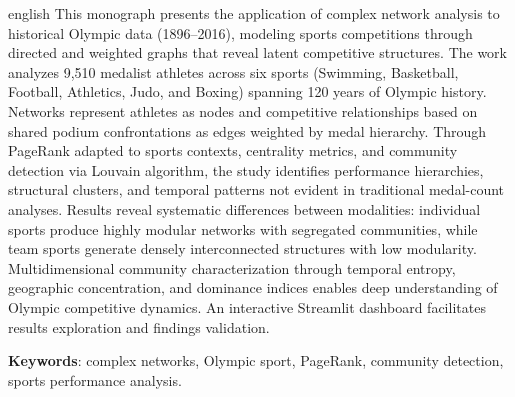 \begin{resumo}[Abstract]
 \begin{otherlanguage*}{english}
   This monograph presents the application of complex network analysis to historical Olympic data (1896--2016), modeling sports competitions through directed and weighted graphs that reveal latent competitive structures. The work analyzes 9,510 medalist athletes across six sports (Swimming, Basketball, Football, Athletics, Judo, and Boxing) spanning 120 years of Olympic history. Networks represent athletes as nodes and competitive relationships based on shared podium confrontations as edges weighted by medal hierarchy. Through PageRank adapted to sports contexts, centrality metrics, and community detection via Louvain algorithm, the study identifies performance hierarchies, structural clusters, and temporal patterns not evident in traditional medal-count analyses. Results reveal systematic differences between modalities: individual sports produce highly modular networks with segregated communities, while team sports generate densely interconnected structures with low modularity. Multidimensional community characterization through temporal entropy, geographic concentration, and dominance indices enables deep understanding of Olympic competitive dynamics. An interactive Streamlit dashboard facilitates results exploration and findings validation.

   \vspace{\onelineskip}

   \noindent
   \textbf{Keywords}: complex networks, Olympic sport, PageRank, community detection, sports performance analysis.
 \end{otherlanguage*}
\end{resumo}
